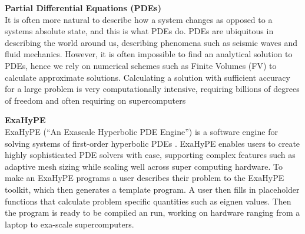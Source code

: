 \textbf{Partial Differential Equations (PDEs)}\\
It is often more natural to describe how a system changes as opposed 
to a systems absolute state, and this is what PDEs do.
PDEs are ubiquitous in describing the world around us, describing 
phenomena such as seismic waves and fluid mechanics.
However, it is often impossible to find an analytical solution to PDEs, hence we rely 
on numerical schemes such as Finite Volumes (FV) to calculate approximate 
solutions.
Calculating a solution with sufficient accuracy for a large problem is very computationally intensive, requiring billions of degrees of freedom and often requiring on supercomputers

\phantom{ }

\textbf{ExaHyPE}\\
ExaHyPE (``An Exascale Hyperbolic PDE Engine'') is a software engine for solving systems of first-order hyperbolic PDEs \cite{exahype}.
ExaHyPE enables users to create highly sophisticated PDE solvers with ease, 
supporting complex features such as adaptive mesh sizing while scaling well across 
super computing hardware.
To make an ExaHyPE programs a user describes their problem to the ExaHyPE toolkit, which then generates a template program.
A user then fills in placeholder functions that calculate problem specific quantities such as eignen values.
Then the program is ready to be compiled an run, working on hardware ranging from a laptop to exa-scale supercomputers.

